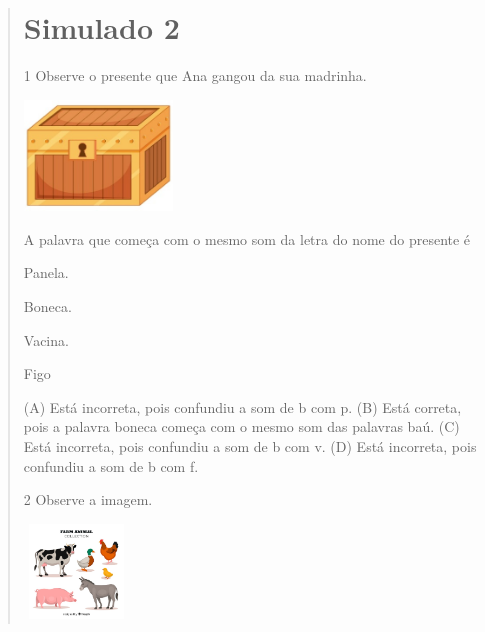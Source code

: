 \begin{verse}
\chapter{Simulado 2}

\num{1} Observe o presente que Ana gangou da sua madrinha.

\includegraphics[width=1.55556in,height=1.16111in]{media/image147.jpeg}


A palavra que começa com o mesmo som da letra do nome do presente é

\begin{minipage}{.5\textwidth}
\begin{escolha}
\item Panela.

\item Boneca.

\item Vacina.

\item Figo
\end{escolha}
\end{minipage}

(A) Está incorreta, pois confundiu a som de b com p.
(B) Está correta, pois a palavra boneca começa com o mesmo som das palavras baú.
(C) Está incorreta, pois confundiu a som de b com v.
(D) Está incorreta, pois confundiu a som de b com f.

\num{2} Observe a imagem.

\includegraphics[width=1.10000in,height=0.99236in]{media/image148.jpeg}


\end{verse}
